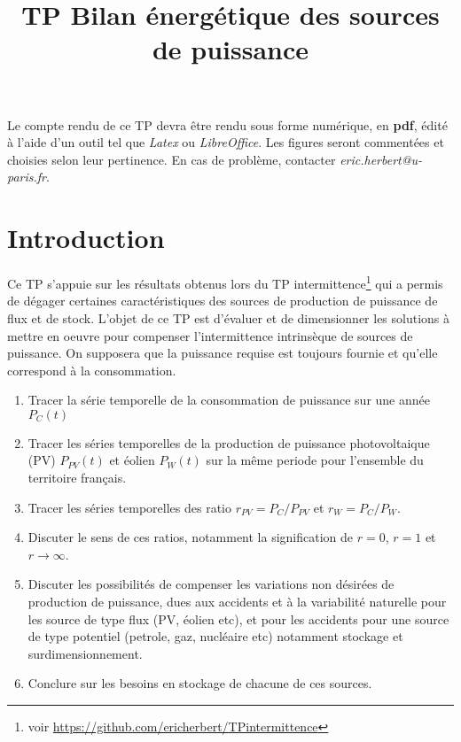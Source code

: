 \documentclass[12pt,a4]{article}
\begin{document}
\title{TP Bilan énergétique des sources de puissance}

\maketitle

Le compte rendu de ce TP devra être rendu sous forme numérique, en \textbf{pdf},
édité à l'aide d'un outil tel que \textit{Latex} ou \textit{LibreOffice}. Les figures seront
commentées et choisies selon leur pertinence.
En cas de problème, contacter \textit{eric.herbert@u-paris.fr}.


\section{Introduction}

Ce TP s'appuie sur les résultats obtenus lors du TP intermittence\footnote{voir \href{https://github.com/ericherbert/TPintermittence}{https://github.com/ericherbert/TPintermittence}} qui a permis de dégager certaines caractéristiques des sources de production de puissance de flux et de stock. L'objet de ce TP est d'évaluer et de dimensionner les solutions à mettre en oeuvre pour compenser l'intermittence intrinsèque de sources de puissance. On supposera que la puissance requise est toujours fournie et qu'elle correspond à la consommation.

\begin{enumerate}
	\item Tracer la série temporelle de la consommation de puissance sur une année $P_C(t)$
	
	\item Tracer les séries temporelles de la production de puissance photovoltaique (PV) $P_{PV}(t)$ et éolien $P_W(t)$ sur la même periode pour l'ensemble du territoire français.
	
	\item Tracer les séries temporelles des ratio $r_{PV} = P_C / P_{PV}$ et $r_{W} = P_C / P_{W}$.
	
	\item Discuter le sens de ces ratios, notamment la signification de $r=0$, $r=1$ et $r \rightarrow \infty$. 
	
	\item Discuter les possibilités de compenser les variations non désirées de production de puissance, dues aux accidents et à la variabilité naturelle pour les source de type flux (PV, éolien etc), et pour les accidents pour une source de type potentiel (petrole, gaz, nucléaire etc) notamment stockage et surdimensionnement.
	
	\item Conclure sur les besoins en stockage de chacune de ces sources. 
\end{enumerate}
\end{document}
